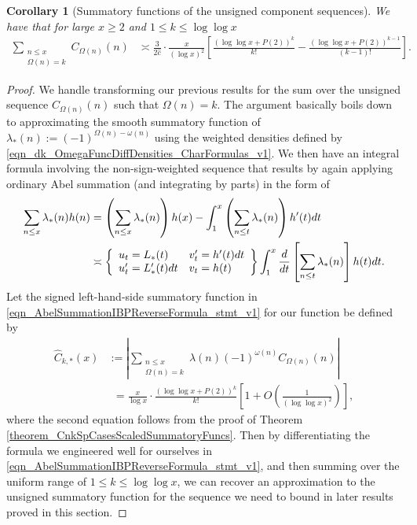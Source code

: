 \documentclass[11pt,reqno,a4letter]{article}
\numberwithin{figure}{section}
\numberwithin{table}{section}
\theoremstyle{plain}
\newtheorem{cor}[theorem]{Corollary}
\numberwithin{theorem}{section}
\theoremstyle{definition}
\begin{document}
\begin{cor}[Summatory functions of the unsigned component sequences] 
\label{cor_SummatoryFuncsOfUnsignedSeqs_v2} 
We have that for large $x \geq 2$ and $1 \leq k \leq \log\log x$ 
\begin{align*} 
\sum_{\substack{n \leq x \\ \Omega(n) = k}} C_{\Omega(n)}(n) & \asymp 
     \frac{3}{2\hat{c}} \cdot \frac{x}{(\log x)^2} \left[ 
     \frac{(\log\log x + P(2))^{k}}{k!} - \frac{(\log\log x + P(2))^{k-1}}{(k-1)!}
     \right]. 
\end{align*} 
\end{cor} 
\begin{proof} 
We handle transforming our previous results for the sum over the unsigned sequence 
$C_{\Omega(n)}(n)$ such that $\Omega(n) = k$. 
The argument basically boils down to approximating the smooth summatory function of 
$\lambda_{\ast}(n) := (-1)^{\Omega(n) - \omega(n)}$ using the weighted 
densities defined by \eqref{eqn_dk_OmegaFuncDiffDensities_CharFormulas_v1}. 
We then have an integral formula involving the non-sign-weighted 
sequence that results by again 
applying ordinary Abel summation (and integrating by parts) in the form of 
\begin{align} 
\label{eqn_AbelSummationIBPReverseFormula_stmt_v1} 
\sum_{n \leq x} \lambda_{\ast}(n) h(n) & = \left(\sum_{n \leq x} \lambda_{\ast}(n)\right) h(x) - 
     \int_{1}^{x} \left(\sum_{n \leq t} \lambda_{\ast}(n)\right) h^{\prime}(t) dt \\ 
\notag 
     & \asymp \left\{\begin{array}{ll} 
     u_t = L_{\ast}(t) & v_t^{\prime} = h^{\prime}(t) dt \\ 
     u_t^{\prime} = L_{\ast}^{\prime}(t) dt & v_t = h(t) 
     \end{array} 
     \right\} 
     \int_1^{x} \frac{d}{dt}\left[\sum_{n \leq t} \lambda_{\ast}(n)\right] h(t) dt. 
\end{align} 
Let the signed left-hand-side summatory function in 
\eqref{eqn_AbelSummationIBPReverseFormula_stmt_v1} for our function be defined by 
\begin{align*} 
\widehat{C}_{k,\ast}(x) & := \left\lvert \sum_{\substack{n \leq x \\ \Omega(n)=k}} 
     \lambda(n) (-1)^{\omega(n)} C_{\Omega(n)}(n) \right\rvert \\ 
     & \phantom{:} = 
     \frac{x}{\log x} \cdot \frac{(\log\log x + P(2))^{k}}{k!} \left[ 
     1 + O\left(\frac{1}{(\log\log x)^2}\right)\right], 
\end{align*} 
where the second equation follows from the proof of 
Theorem \ref{theorem_CnkSpCasesScaledSummatoryFuncs}. 
Then by differentiating the formula we engineered well for ourselves in 
\eqref{eqn_AbelSummationIBPReverseFormula_stmt_v1}, and 
then summing over the uniform range of $1 \leq k \leq \log\log x$, 
we can recover an approximation to the unsigned summatory function for the 
sequence we need to bound in later results proved in this section. 


\end{proof}
\end{document}
